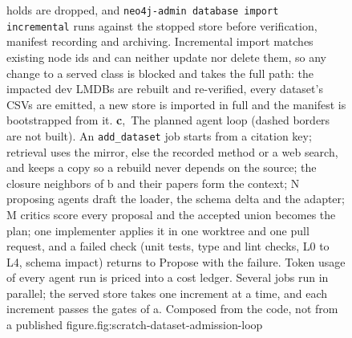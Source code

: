 \begin{figure}[t]
{holds are dropped, and \texttt{neo4j-admin database import incremental} runs against the stopped
store before verification, manifest recording and archiving. Incremental import matches existing
node ids and can neither update nor delete them, so any change to a served class is blocked and
takes the full path: the impacted dev LMDBs are rebuilt and re-verified, every dataset's CSVs are
emitted, a new store is imported in full and the manifest is bootstrapped from it.
\textbf{c},~The planned agent loop (dashed borders are not built). An \texttt{add\_dataset} job
starts from a citation key; retrieval uses the mirror, else the recorded method or a web search,
and keeps a copy so a rebuild never depends on the source; the closure neighbors of b and their
papers form the context; N proposing agents draft the loader, the schema delta and the adapter;
M critics score every proposal and the accepted union becomes the plan; one implementer applies
it in one worktree and one pull request, and a failed check (unit tests, type and lint checks,
L0 to L4, schema impact) returns to Propose with the failure. Token usage of every agent run is
priced into a cost ledger. Several jobs run in parallel; the served store takes one increment at
a time, and each increment passes the gates of a. Composed from the code, not from a published
figure.}{fig:scratch-dataset-admission-loop}
\end{figure}
\FloatBarrier
